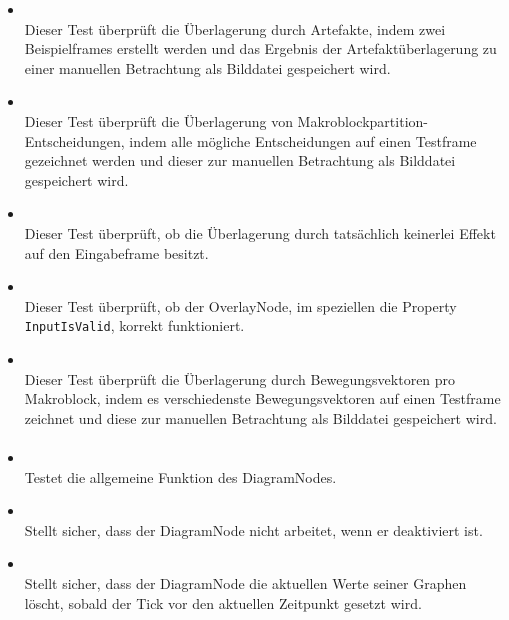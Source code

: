 \begin{itemize}

\item{}~\\
Dieser Test überprüft die Überlagerung durch Artefakte, indem zwei Beispielframes erstellt werden und das Ergebnis der Artefaktüberlagerung zu einer manuellen Betrachtung als Bilddatei gespeichert wird.

\item{}~\\
Dieser Test überprüft die Überlagerung von Makroblockpartition-Entscheidungen, indem alle mögliche Entscheidungen auf einen Testframe gezeichnet werden und dieser zur manuellen Betrachtung als Bilddatei gespeichert wird.

\item{}~\\
Dieser Test überprüft, ob die Überlagerung durch  tatsächlich keinerlei Effekt auf den Eingabeframe besitzt.

\item{}~\\
Dieser Test überprüft, ob der OverlayNode, im speziellen die Property \verb#InputIsValid#, korrekt funktioniert.

\item{}~\\
Dieser Test überprüft die Überlagerung durch Bewegungsvektoren pro Makroblock, indem es verschiedenste Bewegungsvektoren auf einen Testframe zeichnet und diese zur manuellen Betrachtung als Bilddatei gespeichert wird.

\end{itemize}

\paragraph{}
\begin{itemize}
	\item{} \\
		Testet die allgemeine Funktion des DiagramNodes.
	\item{} \\
		Stellt sicher, dass der DiagramNode nicht arbeitet, wenn er deaktiviert ist.
	
	\item{} \\
		Stellt sicher, dass der DiagramNode die aktuellen Werte seiner Graphen löscht, sobald der Tick vor den aktuellen Zeitpunkt gesetzt wird.
\end{itemize}


